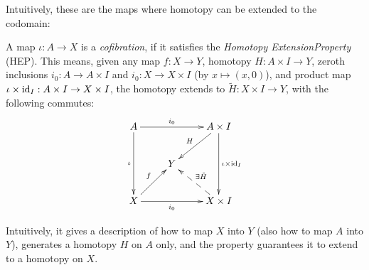 \documentclass{article}
\begin{document}
Intuitively, these are the maps where homotopy can be extended to the codomain:
\begin{defn}
    A map $\iota:A\rightarrow X$ is a \emph{cofibration}, if it satisfies the \emph{Homotopy ExtensionProperty} (HEP). This means, given any map $f:X\rightarrow Y$, homotopy $H:A\times I\rightarrow Y$, zeroth inclusions $i_0:A\rightarrow A\times I$ and $i_0:X\rightarrow X\times I$ (by $x\mapsto (x,0)$), and product map $\iota\times \mathrm{id}_I:A\times I\rightarrow X\times I$, the homotopy extends to $\tilde{H}:X\times I\rightarrow Y$, with the following commutes:
    \[\xymatrix{
    A \ar[dd]_-{\iota} \ar[rr]^-{i_0} && A\times I \ar[dl]_-{H} \ar[dd]^-{\iota\times \id_I}\\
    & Y\\
    X \ar[ur]^-{f} \ar[rr]_-{i_0} && X\times I \ar@{-->}[ul]_-{\exists \tilde{H}}
} \]
\end{defn}
Intuitively, it gives a description of how to map $X$ into $Y$ (also how to map $A$ into $Y$), generates a homotopy $H$ on $A$ only, and the property guarantees it to extend to a homotopy on $X$.
\end{document}
